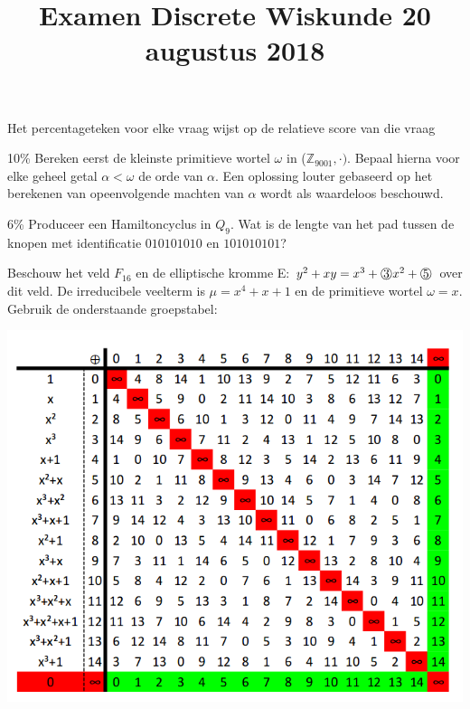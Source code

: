 \documentclass{article}
\def\note#1{\color{cyan} #1 \color{black}}
\def\circled#1{\raisebox{.5pt}{\textcircled{\raisebox{-.9pt} {#1}}}}
\begin{document}
\title{Examen Discrete Wiskunde 20 augustus 2018}
\date{}
\author{}
\maketitle

\note{Het percentageteken voor elke vraag wijst op de relatieve score van die vraag}

\begin{enumerate}
\item{\note{10\%} Bereken eerst de kleinste primitieve wortel $\omega$ in ($\mathbb{Z}_{9001}, \cdot)$. Bepaal hierna voor elke geheel getal $\alpha < \omega$ de orde van $\alpha$. Een oplossing louter gebaseerd op het berekenen van opeenvolgende machten van $\alpha$ wordt als waardeloos beschouwd.}

\item{\note{6\%} Produceer een Hamiltoncyclus in $Q_9$. Wat is de lengte van het pad tussen de knopen met identificatie $010101010$ en $101010101$?}

\item {Beschouw het veld $F_{16}$ en de elliptische kromme E: $y^2+xy = x^3 + \circled{3}x^2 + \circled{5} $ over dit veld. De irreducibele veelterm is $\mu = x^4 + x + 1$ en de primitieve wortel $\omega = x$. Gebruik de onderstaande groepstabel: 
\begin{center}
 \includegraphics[width=\linewidth]{groepstabel}
\end{center}

\item{
    \begin{itemize}[label={}]
    

\end{itemize}}}
\end{enumerate}
\end{document}
